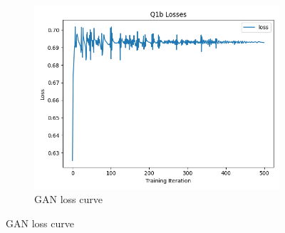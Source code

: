 \documentclass{article}
\begin{document}
\begin{enumerate}[(a)]
\begin{figure}[H]
    \\
    \begin{subfigure}{0.34\textwidth}
        \centering
        \includegraphics[width=\textwidth]{figures/q1b_losses.png}
        \caption{GAN loss curve}
    \end{subfigure}
\end{figure}
\end{enumerate}



\newpage
{}

    
\\
\end{document}
